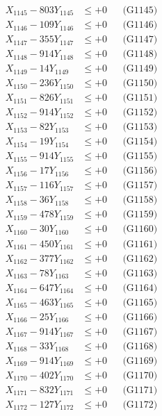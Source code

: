 \documentclass[a4paper,10pt]{article}
\begin{document}
{\begin{align}
X_{1145} - 803Y_{1145} &\leq +0 && \text{(G1145)} \\
X_{1146} - 109Y_{1146} &\leq +0 && \text{(G1146)} \\
X_{1147} - 355Y_{1147} &\leq +0 && \text{(G1147)} \\
X_{1148} - 914Y_{1148} &\leq +0 && \text{(G1148)} \\
X_{1149} - 14Y_{1149} &\leq +0 && \text{(G1149)} \\
X_{1150} - 236Y_{1150} &\leq +0 && \text{(G1150)} \\
\allowbreak
X_{1151} - 826Y_{1151} &\leq +0 && \text{(G1151)} \\
X_{1152} - 914Y_{1152} &\leq +0 && \text{(G1152)} \\
X_{1153} - 82Y_{1153} &\leq +0 && \text{(G1153)} \\
X_{1154} - 19Y_{1154} &\leq +0 && \text{(G1154)} \\
X_{1155} - 914Y_{1155} &\leq +0 && \text{(G1155)} \\
X_{1156} - 17Y_{1156} &\leq +0 && \text{(G1156)} \\
X_{1157} - 116Y_{1157} &\leq +0 && \text{(G1157)} \\
X_{1158} - 36Y_{1158} &\leq +0 && \text{(G1158)} \\
X_{1159} - 478Y_{1159} &\leq +0 && \text{(G1159)} \\
X_{1160} - 30Y_{1160} &\leq +0 && \text{(G1160)} \\
\allowbreak
X_{1161} - 450Y_{1161} &\leq +0 && \text{(G1161)} \\
X_{1162} - 377Y_{1162} &\leq +0 && \text{(G1162)} \\
X_{1163} - 78Y_{1163} &\leq +0 && \text{(G1163)} \\
X_{1164} - 647Y_{1164} &\leq +0 && \text{(G1164)} \\
X_{1165} - 463Y_{1165} &\leq +0 && \text{(G1165)} \\
X_{1166} - 25Y_{1166} &\leq +0 && \text{(G1166)} \\
X_{1167} - 914Y_{1167} &\leq +0 && \text{(G1167)} \\
X_{1168} - 33Y_{1168} &\leq +0 && \text{(G1168)} \\
X_{1169} - 914Y_{1169} &\leq +0 && \text{(G1169)} \\
X_{1170} - 402Y_{1170} &\leq +0 && \text{(G1170)} \\
\allowbreak
X_{1171} - 832Y_{1171} &\leq +0 && \text{(G1171)} \\
X_{1172} - 127Y_{1172} &\leq +0 && \text{(G1172)} \\

\end{align}}
\end{document}
